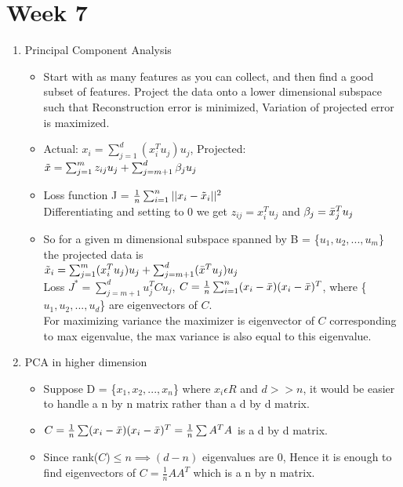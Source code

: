 \documentclass[a4paper]{article}
\begin{document}
 \section{Week 7}
 \begin{enumerate}
     \item Principal Component Analysis
     \begin{itemize}
         \item Start with as many features as you can collect, and then find a good subset of features. Project the data onto a lower dimensional subspace such that Reconstruction error is minimized, Variation of projected error is maximized.
         \item Actual: $x_i = \sum_{j=1}^d (x_i^Tu_j)u_j$, Projected: $\Tilde{x}=\sum_{j=1}^mz_{ij}u_j + \sum_{j=m+1}^d\beta_ju_j$
         \item Loss function J = $\frac{1}{n}\sum_{i=1}^n||x_i-\Tilde{x}_i||^2$\\
         Differentiating and setting to 0 we get $z_{ij} = x_i^Tu_j$ and $\beta_j = \Bar{x}_j^Tu_j$
         \item So for a given m dimensional subspace spanned by B = \{$u_1,u_2,...,u_m$\} the projected data is\\
         $\Tilde{x}_i = \sum_{j=1}^m(x_i^Tu_j)u_j + \sum_{j=m+1}^d(\Bar{x}^Tu_j)u_j$\\
         Loss $J^* = \sum_{j=m+1}^du_j^TCu_j$, $C = \frac{1}{n}\sum_{i=1}^n(x_i-\Bar{x})(x_i-\Bar{x})^T$, where \{$u_1, u_2,...,u_d$\} are eigenvectors of $C$.\\
         For maximizing variance the maximizer is eigenvector of $C$ corresponding to max eigenvalue, the max variance is also equal to this eigenvalue.
     \end{itemize}
     \item PCA in higher dimension
     \begin{itemize}
         \item Suppose D = \{$x_1,x_2,...,x_n$\} where $x_i\epsilon R$ and $d > > n$, it would be easier to handle a n by n matrix rather than a d by d matrix.
         \item $C = \frac{1}{n}\sum (x_i-\Bar{x})(x_i-\Bar{x})^T = \frac{1}{n}\sum A^TA$ is a d by d matrix.
         \item Since rank($C$)$\leq n\implies(d-n)$ eigenvalues are 0, Hence it is enough to find eigenvectors of $C = \frac{1}{n}AA^T$ which is a n by n matrix.
     \end{itemize}
 \end{enumerate}
\end{document}
